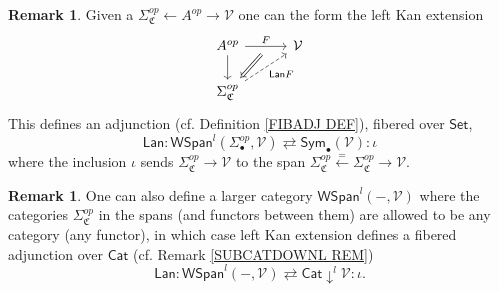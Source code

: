 \documentclass[a4paper,10pt
,draft
]{article}%
\numberwithin{equation}{section}
\numberwithin{figure}{section}
\theoremstyle{definition} %
\newtheorem{remark}[equation]{Remark}%
\newcommand{\1}{\ensuremath{\mathbbm 1}}%
\begin{document}
\begin{remark}\label{LANADJ REM}
Given a $\Sigma^{op}_{\mathfrak{C}} \leftarrow A^{op} \rightarrow \mathcal{V}$
one can the form the left Kan extension
\[
\begin{tikzcd}[column sep = 30pt]
	A^{op}
		\ar{r}[name=U,swap]{}{F} \ar{d} &
	\mathcal{V}	
\\
	|[alias=V]|
	\Sigma_{\mathfrak{C}}^{op} 
		\ar[dashed]{ru}[swap]{\mathsf{Lan} F}
\arrow[Leftarrow, from=V, to=U,shorten >=0.05cm,shorten <=0.05cm]
\end{tikzcd}
\]
This defines an adjunction (cf. Definition \ref{FIBADJ DEF}),
fibered over $\mathsf{Set}$,
\[
	\mathsf{Lan} \colon
	\mathsf{WSpan}^l(\Sigma_{\bullet}^{op},\mathcal{V}) 
\rightleftarrows
	\mathsf{Sym}_{\bullet}(\mathcal{V})
	\colon \iota
\]
where the inclusion $\iota$ sends $\Sigma^{op}_{\mathfrak{C}} \to \mathcal{V}$ 
to the span
$\Sigma^{op}_{\mathfrak{C}} \xleftarrow{=} \Sigma^{op}_{\mathfrak{C}} \to \mathcal{V}$.
\end{remark}



\begin{remark}
One can also define a larger category 
$\mathsf{WSpan}^l( - ,\mathcal{V})$
where the categories $\Sigma_{\mathfrak{C}}^{op}$ in the spans (and functors between them) are allowed to be any category (any functor),
in which case left Kan extension defines a fibered adjunction over 
$\mathsf{Cat}$ (cf. Remark \ref{SUBCATDOWNL REM})
\[
	\mathsf{Lan} \colon
	\mathsf{WSpan}^l( - ,\mathcal{V}) 
\rightleftarrows
	\mathsf{Cat} \downarrow ^l \mathcal{V}
	\colon \iota.
\]
\end{remark}
\end{document}
